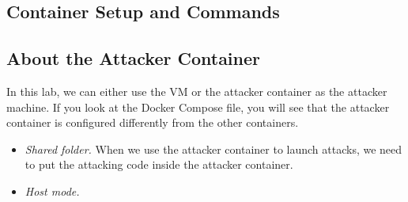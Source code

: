 %
 

\subsection{Container Setup and Commands}



 
\subsection{About the Attacker Container}

In this lab, we can either use the VM or the attacker container
as the attacker machine. If you look at the Docker Compose file, you will
see that the attacker container is configured differently from the other
containers.


\begin{itemize}
\item \textit{Shared folder.} When we use the attacker container
to launch attacks, we need to put the attacking code inside
the attacker container.



\item \textit{Host mode.}

\end{itemize}


%


